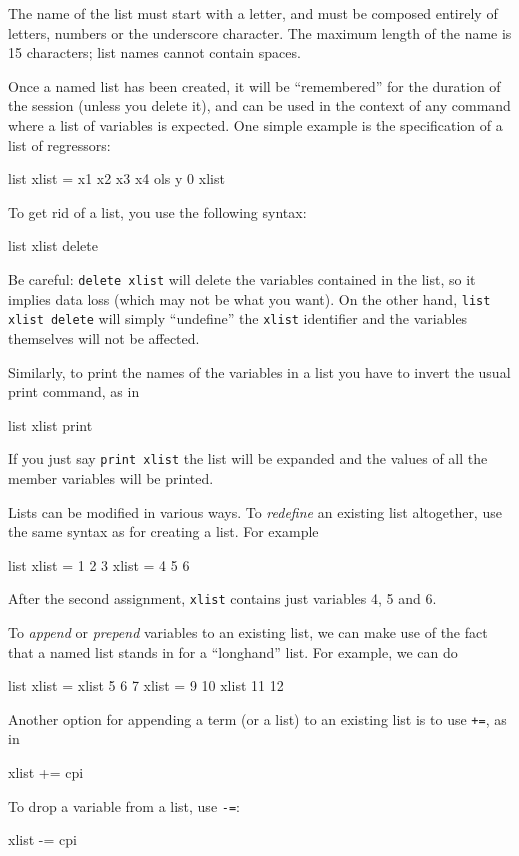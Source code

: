 The name of the list must start with a letter, and must be composed
entirely of letters, numbers or the underscore character.  The maximum
length of the name is 15 characters; list names cannot contain
spaces.  

Once a named list has been created, it will be ``remembered'' for the
duration of the  session (unless you delete it), and can be
used in the context of any  command where a list of
variables is expected.  One simple example is the specification of a
list of regressors:
%
\begin{code}
list xlist = x1 x2 x3 x4
ols y 0 xlist
\end{code}

To get rid of a list, you use the following syntax:
\begin{code}
  list xlist delete
\end{code}
Be careful: \texttt{delete xlist} will delete the variables contained
in the list, so it implies data loss (which may not be what you want).
On the other hand, \texttt{list xlist delete} will simply ``undefine''
the \texttt{xlist} identifier and the variables themselves will not be
affected.

Similarly, to print the names of the variables in a list you have to
invert the usual print command, as in
\begin{code}
  list xlist print
\end{code}
If you just say \texttt{print xlist} the list will be expanded and
the values of all the member variables will be printed.

Lists can be modified in various ways.  To \textit{redefine} an existing
list altogether, use the same syntax as for creating a list.  For
example
%
\begin{code}
list xlist = 1 2 3
xlist = 4 5 6
\end{code}

After the second assignment, \texttt{xlist} contains just variables 4,
5 and 6.

To \textit{append} or \textit{prepend} variables to an existing list,
we can make use of the fact that a named list stands in for a
``longhand'' list.  For example, we can do
%
\begin{code}
list xlist = xlist 5 6 7
xlist = 9 10 xlist 11 12
\end{code}
%
Another option for appending a term (or a list) to an existing list is
to use \texttt{+=}, as in
%
\begin{code}
xlist += cpi
\end{code}
%
To drop a variable from a list, use \texttt{-=}:
%
\begin{code}
xlist -= cpi
\end{code}
%

